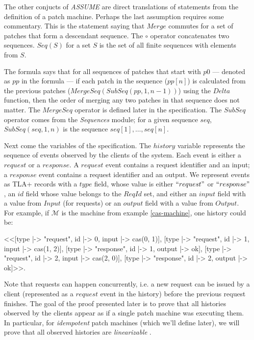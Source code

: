 \documentclass[12pt,a4paper,en]{pracamgr}
\newcommand{\ti}[1]{\textit{#1}}
\newcommand{\mc}[1]{\mathcal{#1}}
\begin{document}
The other conjucts of \ti{ASSUME} are direct translations of statements from the definition of a patch machine. Perhaps the last assumption requires some commentary. This is the statement saying that $Merge$ commutes for a set of patches that form a descendant sequence. The $\circ$ operator concatenates two sequences. $Seq(S)$ for a set $S$ is the set of all finite sequences with elements from $S$.

The formula says that for all sequences of patches that start with $p0$ --- denoted as $pp$ in the formula --- if each patch in the sequence ($pp[n]$) is calculated from the previous patches ($MergeSeq(SubSeq(pp, 1, n-1))$) using the $Delta$ function, then the order of merging any two patches in that sequence does not matter. The $MergeSeq$ operator is defined later in the specification. The $SubSeq$ operator comes from the \ti{Sequences} module; for a given sequence $seq$, $SubSeq(seq, 1, n)$ is the sequence $seq[1], \dots, seq[n]$.

Next come the variables of the specification. The $history$ variable represents the sequence of events observed by the clients of the system. Each event is either a $request$ or a $response$. A $request$ event contains a request identifier and an input; a $response$ event contains a request identifier and an output. We represent events as TLA+ records with a $type$ field, whose value is either $``request"$ or $``response"$, an $id$ field whose value belongs to the $ReqId$ set, and either an $input$ field with a value from $Input$ (for requests) or an $output$ field with a value from $Output$. For example, if $\mc M$ is the machine from example \ref{cas-machine}, one history could be:

\begin{tla}
    <<[type |-> "request", id |-> 0, input |-> cas(0, 1)],
      [type |-> "request", id |-> 1, input |-> cas(1, 2)],
      [type |-> "response", id |-> 1, output |-> ok],
      [type |-> "request", id |-> 2, input |-> cas(2, 0)],
      [type |-> "response", id |-> 2, output |-> ok]>>.
\end{tla}

Note that requests can happen concurrently, i.e. a new request can be issued by a client (represented as a $request$ event in the history) before the previous request finishes. The goal of the proof presented later is to prove that all histories observed by the clients appear as if a single patch machine was executing them. In particular, for \ti{idempotent} patch machines (which we'll define later), we will prove that all observed histories are \ti{linearizable} \cite{h&w}.
\end{document}
